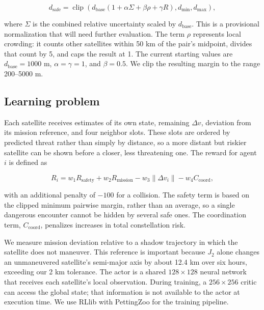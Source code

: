 \documentclass[conference]{IEEEtran}
\begin{document}
\begin{equation}
 d_{\text{safe}} = \operatorname{clip}\!\left(
 d_{\text{base}}(1 + \alpha\Sigma + \beta\rho + \gamma R),
 d_{\min}, d_{\max}\right),
 \label{eq:margin}
\end{equation}

where $\Sigma$ is the combined relative uncertainty scaled by $d_{\text{base}}$. This is a provisional normalization that will need further evaluation. The term $\rho$ represents local crowding: it counts other satellites within 50 km of the pair's midpoint, divides that count by 5, and caps the result at 1. The current starting values are $d_{\text{base}}=1000$ m, $\alpha=\gamma=1$, and $\beta=0.5$. We clip the resulting margin to the range 200--5000 m.

\subsection{Learning problem}

Each satellite receives estimates of its own state, remaining $\Delta v$, deviation from its mission reference, and four neighbor slots. These slots are ordered by predicted threat rather than simply by distance, so a more distant but riskier satellite can be shown before a closer, less threatening one. The reward for agent $i$ is defined as

\begin{equation}
 R_i = w_1 R_{\text{safety}} + w_2 R_{\text{mission}}
       - w_3\lVert\Delta v_i\rVert - w_4 C_{\text{coord}},
 \label{eq:reward}
\end{equation}

with an additional penalty of $-100$ for a collision. The safety term is based on the clipped minimum pairwise margin, rather than an average, so a single dangerous encounter cannot be hidden by several safe ones. The coordination term, $C_{\text{coord}}$, penalizes increases in total constellation risk.

We measure mission deviation relative to a shadow trajectory in which the satellite does not maneuver. This reference is important because $J_2$ alone changes an unmaneuvered satellite's semi-major axis by about 12.4 km over six hours, exceeding our 2 km tolerance. The actor is a shared $128\times128$ neural network that receives each satellite's local observation. During training, a $256\times256$ critic can access the global state; that information is not available to the actor at execution time. We use RLlib with PettingZoo for the training pipeline.
\end{document}
